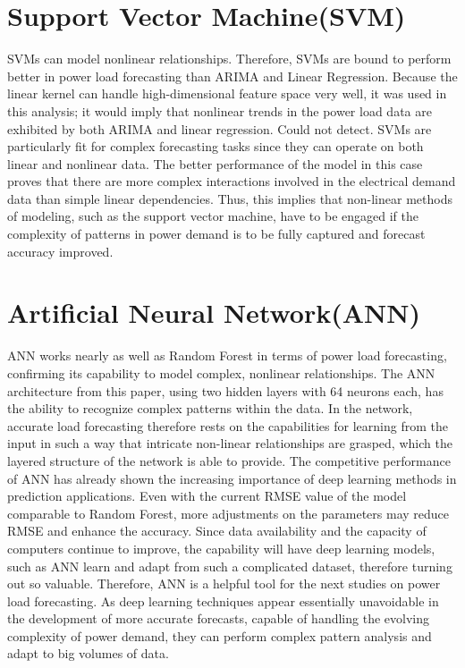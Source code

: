 \documentclass[12pt, a4paper,twoside]{report}
\theoremstyle{plain} %
\theoremstyle{definition} %
\theoremstyle{remark} %
\numberwithin{equation}{chapter}
\begin{document}
\section{Support Vector Machine(SVM)}
    SVMs can model nonlinear relationships. Therefore, SVMs are bound to perform better in power load forecasting than ARIMA and Linear Regression. Because the linear kernel can handle high-dimensional feature space very well, it was used in this analysis; it would imply that nonlinear trends in the power load data are exhibited by both ARIMA and linear regression.
Could not detect. SVMs are particularly fit for complex forecasting tasks since they can operate on both linear and nonlinear data. The better performance of the model in this case proves that there are more complex interactions involved in the electrical demand data than simple linear dependencies. Thus, this implies that non-linear methods of modeling, such as the support vector machine, have to be engaged if the complexity of patterns in power demand is to be fully captured and forecast accuracy improved. 

\section{Artificial Neural Network(ANN)}
    ANN works nearly as well as Random Forest in terms of power load forecasting, confirming its capability to model complex, nonlinear relationships. The ANN architecture from this paper, using two hidden layers with 64 neurons each, has the ability to recognize complex patterns within the data. In the network, accurate load forecasting therefore rests on the capabilities for learning from the input in such a way that intricate non-linear relationships are grasped, which the layered structure of the network is able to provide. The competitive performance of ANN has already shown the increasing importance of deep learning methods in prediction applications. Even with the current RMSE value of the model comparable to Random Forest, more adjustments on the parameters may reduce RMSE and enhance the accuracy. Since data availability and the capacity of computers continue to improve, the capability will have deep learning models, such as ANN learn and adapt from such a complicated dataset, therefore turning out so valuable. Therefore, ANN is a helpful tool for the next studies on power load forecasting. As deep learning techniques appear essentially unavoidable in the development of more accurate forecasts, capable of handling the evolving complexity of power demand, they can perform complex pattern analysis and adapt to big volumes of data.
\end{document}
